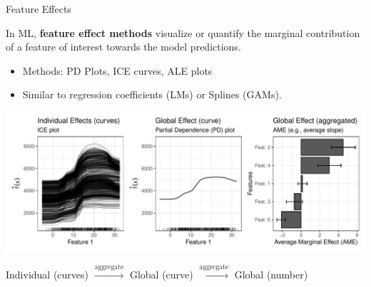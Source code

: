 \documentclass[11pt,compress,t,notes=noshow, aspectratio=169, xcolor=table]{beamer}
\begin{document}
\begin{frame}{Feature Effects}

In ML, \textbf{feature effect methods} visualize or quantify the marginal contribution of a feature of interest towards the model predictions. %
\begin{itemize}
\item Methods: PD Plots, ICE curves, ALE plots
\item Similar to regression coefficients (LMs) or Splines (GAMs).
\end{itemize}

\centerline{\includegraphics[width=\textwidth]{figure/feature-effect.pdf}}

\hspace{8px} \small Individual (curves) \hspace{2px}
$\xrightarrow[]{\text{aggregate}}$ \hspace{2px} Global (curve) \hspace{2px}
$\xrightarrow[]{\text{aggregate}}$ \hspace{2px} Global (number)


\end{frame}


%
%
%
%
\end{document}
